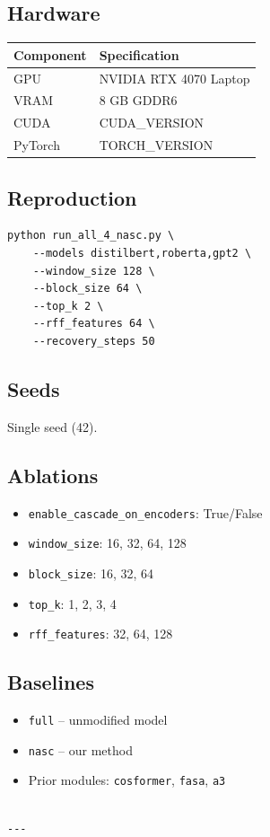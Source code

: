 \subsection{Hardware}

\begin{table}[H]
\centering
\small
\begin{tabular}{ll}
\toprule
\textbf{Component} & \textbf{Specification} \\
\midrule
GPU & NVIDIA RTX 4070 Laptop \\
VRAM & 8 GB GDDR6 \\
CUDA & {{CUDA\_VERSION}} \\
PyTorch & {{TORCH\_VERSION}} \\
\bottomrule
\end{tabular}
\end{table}

\subsection{Reproduction}

\begin{lstlisting}
python run_all_4_nasc.py \
    --models distilbert,roberta,gpt2 \
    --window_size 128 \
    --block_size 64 \
    --top_k 2 \
    --rff_features 64 \
    --recovery_steps 50
\end{lstlisting}

\subsection{Seeds}

Single seed (42).

\subsection{Ablations}

\begin{itemize}
\item \texttt{enable\_cascade\_on\_encoders}: True/False
\item \texttt{window\_size}: 16, 32, 64, 128
\item \texttt{block\_size}: 16, 32, 64
\item \texttt{top\_k}: 1, 2, 3, 4
\item \texttt{rff\_features}: 32, 64, 128

\end{itemize}
\subsection{Baselines}

\begin{itemize}
\item \texttt{full} -- unmodified model
\item \texttt{nasc} -- our method
\item Prior modules: \texttt{cosformer}, \texttt{fasa}, \texttt{a3}
\end{itemize}
\begin{lstlisting}

---
\end{lstlisting}
